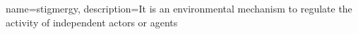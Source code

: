 

{
        name=stigmergy,
        description={It is an environmental mechanism to regulate the activity of independent actors or agents}
}
 